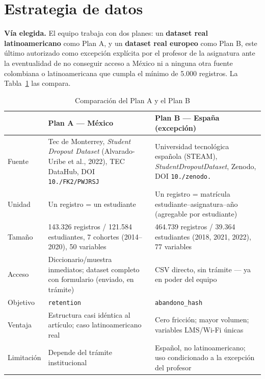\documentclass[11pt,a4paper]{article}
\newcommand{\dt}{.\allowbreak}
\newcommand{\us}{\_\allowbreak}
\newcommand{\sl}{/\allowbreak}
\begin{document}
\section{Estrategia de datos}

\textbf{Vía elegida.} El equipo trabaja con dos planes: un \textbf{dataset real latinoamericano} como Plan A, y un \textbf{dataset real europeo} como Plan B, este último autorizado como excepción explícita por el profesor de la asignatura ante la eventualidad de no conseguir acceso a México ni a ninguna otra fuente colombiana o latinoamericana que cumpla el mínimo de 5.000 registros. La Tabla~\ref{tab:fuentes} las compara.

\begin{table}[h!]
\centering
\footnotesize
\caption{Comparación del Plan A y el Plan B}
\label{tab:fuentes}
\begin{tabular}{p{1.9cm}p{4.7cm}p{4.9cm}}
\toprule
 & \textbf{Plan A --- México} & \textbf{Plan B --- España (excepción)} \\
\midrule
Fuente & Tec de Monterrey, \textit{Student Dropout Dataset} (Alvarado-Uribe et al., 2022), TEC DataHub, DOI \texttt{10\dt 57687\sl FK2\sl PWJRSJ} & Universidad tecnológica española (STEAM), \textit{StudentDropoutDataset}, Zenodo, DOI \texttt{10\dt 5281\sl zenodo\dt 17239943} \\
Unidad & Un registro = un estudiante & Un registro = matrícula estudiante--asignatura--año (agregable por estudiante) \\
Tamaño & 143.326 registros / 121.584 estudiantes, 7 cohortes (2014--2020), 50 variables & 464.739 registros / 39.364 estudiantes (2018, 2021, 2022), 77 variables \\
Acceso & Diccionario/muestra inmediatos; dataset completo con formulario (enviado, en trámite) & CSV directo, sin trámite --- ya en poder del equipo \\
Objetivo & \texttt{retention} & \texttt{abandono\us hash} \\
Ventaja & Estructura casi idéntica al artículo; caso latinoamericano real & Cero fricción; mayor volumen; variables LMS/Wi-Fi únicas \\
Limitación & Depende del trámite institucional & Español, no latinoamericano; uso condicionado a la excepción del profesor \\
\bottomrule
\end{tabular}
\end{table}
\end{document}
